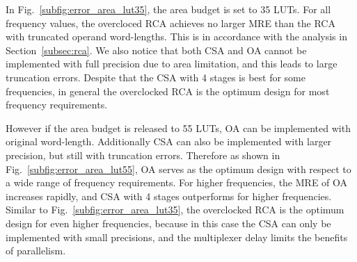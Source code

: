 \documentclass[10pt, conference, compsocconf]{IEEEtran}
\begin{document}
In Fig.~\ref{subfig:error_area_lut35}, the area budget is set to 35 LUTs. For all frequency values, the overcloced RCA achieves no larger MRE than the RCA with truncated operand word-lengths. This is in accordance with the analysis in Section~\ref{subsec:rca}. We also notice that both CSA and OA cannot be implemented with full precision due to area limitation, and this leads to large truncation errors. Despite that the CSA with 4 stages is best for some frequencies, in general the overclocked RCA is the optimum design for most frequency requirements.  

However if the area budget is released to 55 LUTs, OA can be implemented with original word-length. Additionally CSA can also be implemented with larger precision, but still with truncation errors. Therefore as shown in Fig.~\ref{subfig:error_area_lut55}, OA serves as the optimum design with respect to a wide range of frequency requirements. For higher frequencies, the MRE of OA increases rapidly, and CSA with 4 stages outperforms for higher frequencies. Similar to Fig.~\ref{subfig:error_area_lut35}, the overclocked RCA is the optimum design for even higher frequencies, because in this case the CSA can only be implemented with small precisions, and the multiplexer delay limits the benefits of parallelism.
\end{document}
